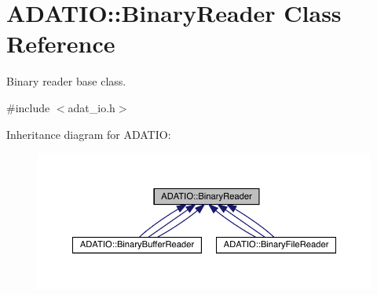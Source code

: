 \hypertarget{classADATIO_1_1BinaryReader}{}\section{A\+D\+A\+T\+IO\+:\+:Binary\+Reader Class Reference}
\label{classADATIO_1_1BinaryReader}


Binary reader base class.  




{\ttfamily \#include $<$adat\+\_\+io.\+h$>$}



Inheritance diagram for A\+D\+A\+T\+IO\+:
\nopagebreak
\begin{figure}[H]
\begin{center}
\leavevmode
\includegraphics[width=350pt]{d9/d56/classADATIO_1_1BinaryReader__inherit__graph}
\end{center}
\end{figure}
